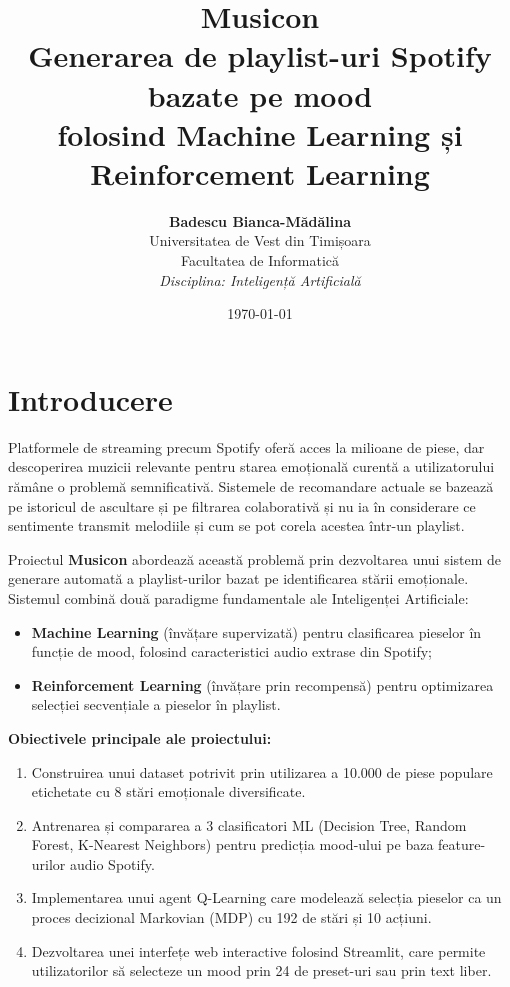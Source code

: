 \documentclass[12pt,a4paper]{article}
\title{
    \textbf{Musicon} \\[0.5em]
    \large Generarea de playlist-uri Spotify bazate pe mood \\
    folosind Machine Learning și Reinforcement Learning
}
\author{
    \textbf{Badescu Bianca-Mădălina} \\[0.3em]
    \small Universitatea de Vest din Timișoara \\[0.1em]
    \small Facultatea de Informatică \\[0.3em]
    \small \textit{Disciplina: Inteligență Artificială}
}
\date{\today}
\begin{document}
\maketitle
\thispagestyle{empty}
\newpage

\tableofcontents
\newpage

\section{Introducere}

Platformele de streaming precum Spotify oferă acces la milioane de piese, dar descoperirea muzicii relevante pentru starea emoțională curentă a utilizatorului rămâne o problemă semnificativă. Sistemele de recomandare actuale se bazează pe istoricul de ascultare și pe filtrarea colaborativă și nu ia în considerare ce sentimente transmit melodiile și cum se pot corela acestea într-un playlist.

Proiectul \textbf{Musicon} abordează această problemă prin dezvoltarea unui sistem de generare automată a playlist-urilor bazat pe identificarea stării emoționale. Sistemul combină două paradigme fundamentale ale Inteligenței Artificiale:
\begin{itemize}
    \item \textbf{Machine Learning} (învățare supervizată) pentru clasificarea pieselor în funcție de mood, folosind caracteristici audio extrase din Spotify;
    \item \textbf{Reinforcement Learning} (învățare prin recompensă) pentru optimizarea selecției secvențiale a pieselor în playlist.
\end{itemize}

\textbf{Obiectivele principale ale proiectului:}
\begin{enumerate}
    \item Construirea unui dataset potrivit prin utilizarea a 10.000 de piese populare etichetate cu 8 stări emoționale diversificate.
    \item Antrenarea și compararea a 3 clasificatori ML (Decision Tree, Random Forest, K-Nearest Neighbors) pentru predicția mood-ului pe baza feature-urilor audio Spotify.
    \item Implementarea unui agent Q-Learning care modelează selecția pieselor ca un proces decizional Markovian (MDP) cu 192 de stări și 10 acțiuni.
    \item Dezvoltarea unei interfețe web interactive folosind Streamlit, care permite utilizatorilor să selecteze un mood prin 24 de preset-uri sau prin text liber.
\end{enumerate}
\end{document}
